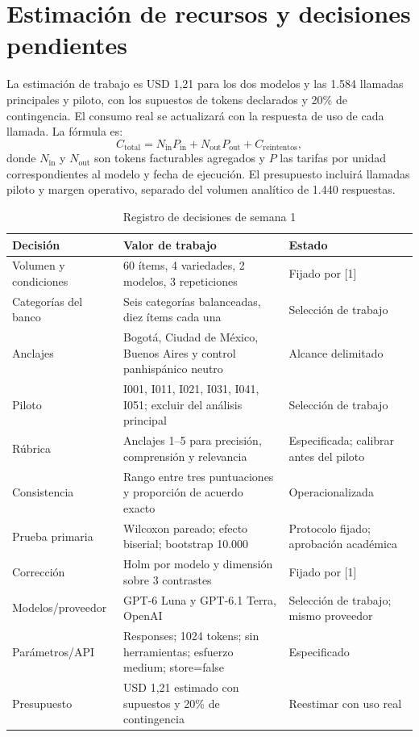 \documentclass[conference]{IEEEtran}
\begin{document}
\section{Estimación de recursos y decisiones pendientes}
La estimación de trabajo es USD 1,21 para los dos modelos y las 1.584 llamadas principales y piloto, con los supuestos de tokens declarados y 20\% de contingencia. El consumo real se actualizará con la respuesta de uso de cada llamada. La fórmula es:
\begin{equation}
C_{\mathrm{total}}=N_{\mathrm{in}}P_{\mathrm{in}}+N_{\mathrm{out}}P_{\mathrm{out}}+C_{\mathrm{reintentos}},
\end{equation}
donde $N_{\mathrm{in}}$ y $N_{\mathrm{out}}$ son tokens facturables agregados y $P$ las tarifas por unidad correspondientes al modelo y fecha de ejecución. El presupuesto incluirá llamadas piloto y margen operativo, separado del volumen analítico de 1.440 respuestas.

\begin{table}[!t]
\caption{Registro de decisiones de semana 1}
\label{tab:decisions}
\centering
\scriptsize\setlength{\tabcolsep}{2.5pt}\begin{tabularx}{\columnwidth}{p{}X p{}}
\toprule
Decisión & Valor de trabajo & Estado \\
\midrule
Volumen y condiciones & 60 ítems, 4 variedades, 2 modelos, 3 repeticiones & Fijado por [1] \\
Categorías del banco & Seis categorías balanceadas, diez ítems cada una & Selección de trabajo \\
Anclajes & Bogotá, Ciudad de México, Buenos Aires y control panhispánico neutro & Alcance delimitado \\
Piloto & I001, I011, I021, I031, I041, I051; excluir del análisis principal & Selección de trabajo \\
Rúbrica & Anclajes 1--5 para precisión, comprensión y relevancia & Especificada; calibrar antes del piloto \\
Consistencia & Rango entre tres puntuaciones y proporción de acuerdo exacto & Operacionalizada \\
Prueba primaria & Wilcoxon pareado; efecto biserial; bootstrap 10.000 & Protocolo fijado; aprobación académica \\
Corrección & Holm por modelo y dimensión sobre 3 contrastes & Fijado por [1] \\
Modelos/proveedor & GPT-6 Luna y GPT-6.1 Terra, OpenAI & Selección de trabajo; mismo proveedor \\
Parámetros/API & Responses; 1024 tokens; sin herramientas; esfuerzo medium; store=false & Especificado \\
Presupuesto & USD 1,21 estimado con supuestos y 20\% de contingencia & Reestimar con uso real \\
\bottomrule
\end{tabularx}
\end{table}
\end{document}
